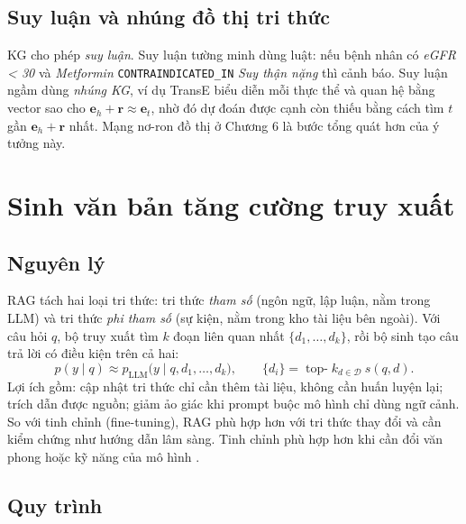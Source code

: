 \subsection{Suy luận và nhúng đồ thị tri thức}

KG cho phép \emph{suy luận}. Suy luận tường minh dùng luật: nếu bệnh nhân có \emph{eGFR < 30} và \emph{Metformin} \texttt{CONTRAINDICATED\_IN} \emph{Suy thận nặng} thì cảnh báo. Suy luận ngầm dùng \emph{nhúng KG}, ví dụ TransE \cite{bordes2013} biểu diễn mỗi thực thể và quan hệ bằng vector sao cho $\mathbf e_h + \mathbf r \approx \mathbf e_t$, nhờ đó dự đoán được cạnh còn thiếu bằng cách tìm $t$ gần $\mathbf e_h+\mathbf r$ nhất. Mạng nơ-ron đồ thị ở Chương 6 là bước tổng quát hơn của ý tưởng này.

\section{Sinh văn bản tăng cường truy xuất}

\subsection{Nguyên lý}

RAG \cite{lewis2020} tách hai loại tri thức: tri thức \emph{tham số} (ngôn ngữ, lập luận, nằm trong LLM) và tri thức \emph{phi tham số} (sự kiện, nằm trong kho tài liệu bên ngoài). Với câu hỏi $q$, bộ truy xuất tìm $k$ đoạn liên quan nhất $\{d_1,\ldots,d_k\}$, rồi bộ sinh tạo câu trả lời có điều kiện trên cả hai:
\begin{equation}
p(y \mid q) \approx p_{\text{LLM}}\big(y \mid q, d_1, \ldots, d_k\big),\qquad \{d_i\} = \operatorname{top-}k_{d\in\mathcal D}\ s(q, d).
\label{eq:rag}
\end{equation}
Lợi ích gồm: cập nhật tri thức chỉ cần thêm tài liệu, không cần huấn luyện lại; trích dẫn được nguồn; giảm ảo giác khi prompt buộc mô hình chỉ dùng ngữ cảnh. So với tinh chỉnh (fine-tuning), RAG phù hợp hơn với tri thức thay đổi và cần kiểm chứng như hướng dẫn lâm sàng. Tinh chỉnh phù hợp hơn khi cần đổi văn phong hoặc kỹ năng của mô hình \cite{gao2023rag}.

\subsection{Quy trình}

